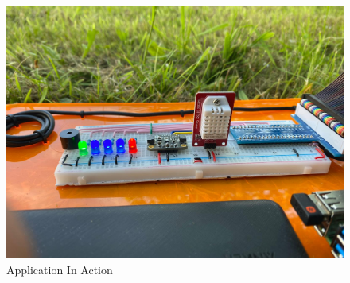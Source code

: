 \documentclass{ueacmpstyle}
\begin{document}
            \clearpage
            \begin{figure}[h]
                \centering
                \includegraphics[width=\linewidth]{Images/bread2.png}
                \caption{Application In Action}
                \label{Figure App In Action}
            
            \end{figure}
            \clearpage
        
\end{document}
